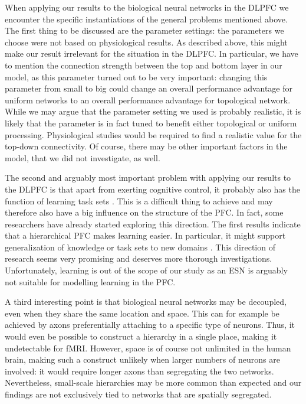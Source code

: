 \documentclass[10pt,a4paper]{report}
\begin{document}
When applying our results to the biological neural networks in the DLPFC we encounter the specific instantiations of the general problems mentioned above. The first thing to be discussed are the parameter settings: the parameters we choose were not based on physiological results. As described above, this might make our result irrelevant for the situation in the DLPFC. In particular, we have to mention the connection strength between the top and bottom layer in our model, as this parameter turned out to be very important: changing this parameter from small to big could change an overall performance advantage for uniform networks to an overall performance advantage for topological network. While we may argue that the parameter setting we used is probably realistic, it is likely that the parameter is in fact tuned to benefit either topological or uniform processing. Physiological studies would be required to find a realistic value for the top-down connectivity. Of course, there may be other important factors in the model, that we did not investigate, as well.


The second and arguably most important problem with applying our results to the DLPFC is that apart from exerting cognitive control, it probably also has the function of learning task sets \citep{Sakai2008}. This is a difficult thing to achieve and may therefore also have a big influence on the structure of the PFC. In fact, some researchers have already started exploring this direction. The first results indicate that a hierarchical PFC makes learning easier. In particular, it might support generalization of knowledge or task sets to new domains \citep{Reynolds2009}. This direction of research seems very promising and deserves more thorough investigations. Unfortunately, learning is out of the scope of our study as an ESN is arguably not suitable for modelling learning in the PFC.

A third interesting point is that biological neural networks may be decoupled, even when they share the same location and space. This can for example be achieved by axons preferentially attaching to a specific type of neurons. Thus, it would even be possible to construct a hierarchy in a single place, making it undetectable for fMRI. However, space is of course not unlimited in the human brain, making such a construct unlikely when larger numbers of neurons are involved: it would require longer axons than segregating the two networks. Nevertheless, small-scale hierarchies may be more common than expected and our findings are not exclusively tied to networks that are spatially segregated.
\end{document}
